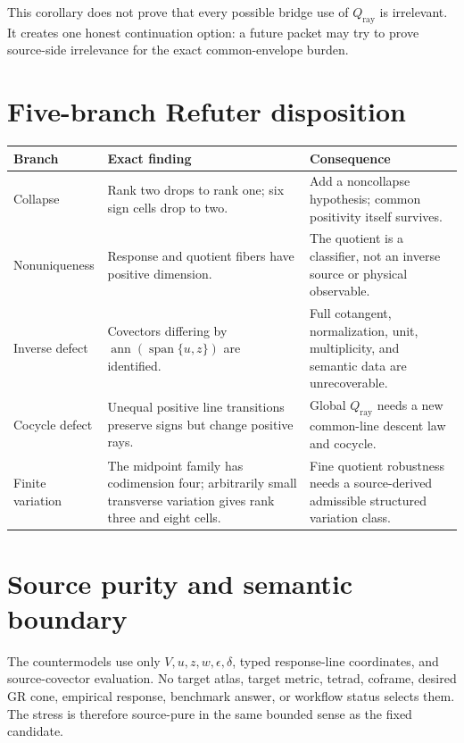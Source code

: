 \documentclass[11pt]{article}
\newcommand{\Qray}{Q_{\mathrm{ray}}}
\newcommand{\ann}{\operatorname{ann}}
\begin{document}
This corollary does not prove that every possible bridge use of $\Qray$ is
irrelevant.  It creates one honest continuation option: a future packet may
try to prove source-side irrelevance for the exact common-envelope burden.

\section{Five-branch Refuter disposition}

\renewcommand{\arraystretch}{1.25}
\begin{longtable}{>{\raggedright\arraybackslash}p{}
                  >{\raggedright\arraybackslash}p{}
                  >{\raggedright\arraybackslash}p{}}
\toprule
Branch & Exact finding & Consequence\\
\midrule
\endhead
Collapse & Rank two drops to rank one; six sign cells drop to two. & Add a
noncollapse hypothesis; common positivity itself survives.\\
Nonuniqueness & Response and quotient fibers have positive dimension. & The
quotient is a classifier, not an inverse source or physical observable.\\
Inverse defect & Covectors differing by
$\ann(\operatorname{span}\{u,z\})$ are identified. & Full cotangent,
normalization, unit, multiplicity, and semantic data are unrecoverable.\\
Cocycle defect & Unequal positive line transitions preserve signs but change
positive rays. & Global $\Qray$ needs a new common-line descent law and
cocycle.\\
Finite variation & The midpoint family has codimension four; arbitrarily small
transverse variation gives rank three and eight cells. & Fine quotient
robustness needs a source-derived admissible structured variation class.\\
\bottomrule
\end{longtable}

\section{Source purity and semantic boundary}

The countermodels use only $V,u,z,w,\epsilon,\delta$, typed response-line
coordinates, and source-covector evaluation.  No target atlas, target metric,
tetrad, coframe, desired GR cone, empirical response, benchmark answer, or
workflow status selects them.  The stress is therefore source-pure in the same
bounded sense as the fixed candidate.
\end{document}

